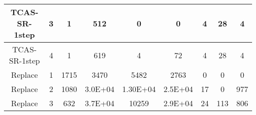 \begin{table}[]
\begin{tabular}{@{}ccccccccc@{}}
        TCAS-SR-1step                                               & 3                                                            & 1                                                          & 512                                                         & 0                                                              & 0                                                              & 4                                                          & 28                                                            & 4        \\ \midrule
        TCAS-SR-1step                                               & 4                                                            & 1                                                          & 619                                                         & 4                                                              & 72                                                             & 4                                                          & 28                                                            & 4        \\ \midrule
        Replace                                                     & 1                                                            & 1715                                                       & 3470                                                        & 5482                                                           & 2763                                                           & 0                                                          & 0                                                             & 0        \\ \midrule
        Replace                                                     & 2                                                            & 1080                                                       & 3.0E+04                                                     & 1.30E+04                                                       & 2.5E+04                                                        & 17                                                         & 0                                                             & 977      \\ \midrule
        Replace                                                     & 3                                                            & 632                                                        & 3.7E+04                                                     & 10259                                                          & 2.9E+04                                                        & 24                                                         & 113                                                           & 806      \\ \midrule

\end{tabular}
\end{table}
